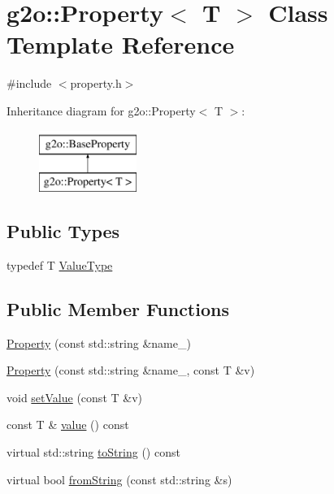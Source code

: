 \hypertarget{classg2o_1_1_property}{}\section{g2o\+:\+:Property$<$ T $>$ Class Template Reference}
\label{classg2o_1_1_property}


{\ttfamily \#include $<$property.\+h$>$}

Inheritance diagram for g2o\+:\+:Property$<$ T $>$\+:\begin{figure}[H]
\begin{center}
\leavevmode
\includegraphics[height=2.000000cm]{classg2o_1_1_property}
\end{center}
\end{figure}
\subsection*{Public Types}
\begin{DoxyCompactItemize}
\item 
typedef T \mbox{\hyperlink{classg2o_1_1_property_a0387bb74c147b54b8fa4f4cd5629fbf8}{Value\+Type}}
\end{DoxyCompactItemize}
\subsection*{Public Member Functions}
\begin{DoxyCompactItemize}
\item 
\mbox{\hyperlink{classg2o_1_1_property_a15e39f5b08067cff86d2a4f5c838aeee}{Property}} (const std\+::string \&name\+\_\+)
\item 
\mbox{\hyperlink{classg2o_1_1_property_a888c7b06876668a0132e32a2a0e28311}{Property}} (const std\+::string \&name\+\_\+, const T \&v)
\item 
void \mbox{\hyperlink{classg2o_1_1_property_a438d1ca338ce8c3a371654023200068d}{set\+Value}} (const T \&v)
\item 
const T \& \mbox{\hyperlink{classg2o_1_1_property_a76f706f786f6f1ed351f0629b3bbd382}{value}} () const
\item 
virtual std\+::string \mbox{\hyperlink{classg2o_1_1_property_a8e3d3f2f79d274384588a1a5b9198cf5}{to\+String}} () const
\item 
virtual bool \mbox{\hyperlink{classg2o_1_1_property_a5c0a6eacc67e98d4f0b3fd9fe856dbbe}{from\+String}} (const std\+::string \&s)
\end{DoxyCompactItemize}
